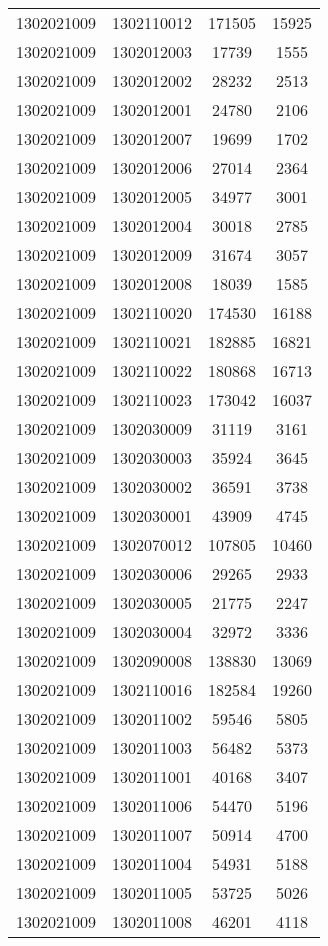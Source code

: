 \begin{longtable}[h]{llcc}
		1302021009 & 1302110012 & 171505 & 15925\\
		1302021009 & 1302012003 & 17739 & 1555\\
		1302021009 & 1302012002 & 28232 & 2513\\
		1302021009 & 1302012001 & 24780 & 2106\\
		1302021009 & 1302012007 & 19699 & 1702\\
		1302021009 & 1302012006 & 27014 & 2364\\
		1302021009 & 1302012005 & 34977 & 3001\\
		1302021009 & 1302012004 & 30018 & 2785\\
		1302021009 & 1302012009 & 31674 & 3057\\
		1302021009 & 1302012008 & 18039 & 1585\\
		1302021009 & 1302110020 & 174530 & 16188\\
		1302021009 & 1302110021 & 182885 & 16821\\
		1302021009 & 1302110022 & 180868 & 16713\\
		1302021009 & 1302110023 & 173042 & 16037\\
		1302021009 & 1302030009 & 31119 & 3161\\
		1302021009 & 1302030003 & 35924 & 3645\\
		1302021009 & 1302030002 & 36591 & 3738\\
		1302021009 & 1302030001 & 43909 & 4745\\
		1302021009 & 1302070012 & 107805 & 10460\\
		1302021009 & 1302030006 & 29265 & 2933\\
		1302021009 & 1302030005 & 21775 & 2247\\
		1302021009 & 1302030004 & 32972 & 3336\\
		1302021009 & 1302090008 & 138830 & 13069\\
		1302021009 & 1302110016 & 182584 & 19260\\
		1302021009 & 1302011002 & 59546 & 5805\\
		1302021009 & 1302011003 & 56482 & 5373\\
		1302021009 & 1302011001 & 40168 & 3407\\
		1302021009 & 1302011006 & 54470 & 5196\\
		1302021009 & 1302011007 & 50914 & 4700\\
		1302021009 & 1302011004 & 54931 & 5188\\
		1302021009 & 1302011005 & 53725 & 5026\\
		1302021009 & 1302011008 & 46201 & 4118\\

\end{longtable}
